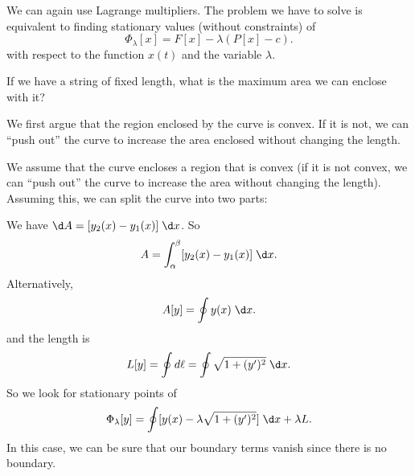 \documentclass[a4paper]{article}
\begin{document}
We can again use Lagrange multipliers. The problem we have to solve is equivalent to finding stationary values (without constraints) of
\[
  \Phi_\lambda [x] = F[x] - \lambda(P[x] - c).
\]
with respect to the function $x(t)$ and the variable $\lambda$.

\begin{eg}
  If we have a string of fixed length, what is the maximum area we can enclose with it?

  We first argue that the region enclosed by the curve is convex. If it is not, we can ``push out'' the curve to increase the area enclosed without changing the length.

  We assume that the curve encloses a region that is convex (if it is not convex, we can ``push out'' the curve to increase the area without changing the length). Assuming this, we can split the curve into two parts:
  \begin{center}
  \end{center}
  We have $\d A = [y_2(x) - y_1(x)]\;\d x$. So
  \[
    A = \int_\alpha^\beta [y_2(x) - y_1(x)]\;\d x.
  \]
  Alternatively,
  \[
    A[y] = \oint y(x)\;\d x.
  \]
  and the length is
  \[
    L[y] = \oint d\ell = \oint \sqrt{1 + (y')^2}\;\d x.
  \]
  So we look for stationary points of
  \[
    \Phi_\lambda [y] = \oint [y(x) - \lambda\sqrt{1 + (y')^2}]\;\d x + \lambda L.
  \]
  In this case, we can be sure that our boundary terms vanish since there is no boundary.


\end{eg}
\end{document}
